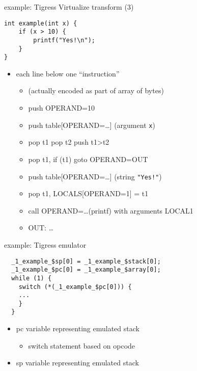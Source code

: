 \begin{frame}[fragile,label=VirtISA2]{example: Tigress Virtualize transform (3)}
\begin{lstlisting}[style=script]
int example(int x) {
    if (x > 10) {
        printf("Yes!\n");
    }   
}
\end{lstlisting}
\begin{itemize}
\item each line below one ``instruction''
    \begin{itemize}
    \item (actually encoded as part of array of bytes)
    \end{itemize}
\begin{itemize}
\item push OPERAND=10
\item push table[OPERAND=\ldots] (argument \texttt{x})
\item pop t1 pop t2 push t1>t2
\item pop t1, if (t1) goto OPERAND=OUT
\item push table[OPERAND=\ldots] (string \texttt{"Yes!"})
\item pop t1, LOCALS[OPERAND=1] = t1
\item call OPERAND=\ldots (printf) with arguments LOCAL1
\item OUT: \ldots
\end{itemize}
\end{itemize}
\end{frame}

\begin{frame}[fragile,label=VirtISAEx]{example: Tigress emulator}
\begin{lstlisting}
  _1_example_$sp[0] = _1_example_$stack[0];
  _1_example_$pc[0] = _1_example_$array[0];
  while (1) {
    switch (*(_1_example_$pc[0])) {
    ...
    }
  }
\end{lstlisting}
\begin{itemize}
\item pc variable representing emulated stack
    \begin{itemize}
    \item switch statement based on opcode
    \end{itemize}
\item sp variable representing emulated stack
\end{itemize}
\end{frame}


